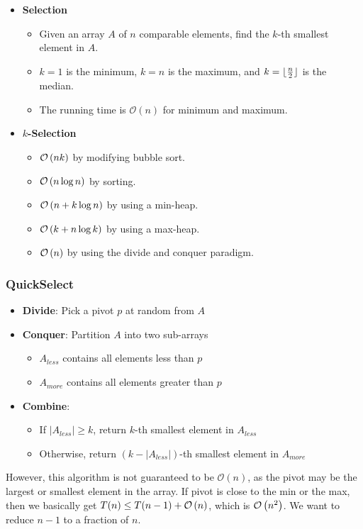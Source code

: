 \begin{itemize}
    \item \textbf{Selection}
    
    \begin{itemize}
        \item Given an array $A$ of $n$ comparable elements, find the $k$-th smallest element in $A$. 
        \item $k = 1$ is the minimum, $k = n$ is the maximum, and $k = \lfloor \frac{n}{2} \rfloor$ is the median. 
        \item The running time is $\mathcal{O}(n)$ for minimum and maximum. 
    \end{itemize}

    \item \textbf{$k$-Selection}

    \begin{itemize}
        \item $\mathcal{O}\left(nk\right)$ by modifying bubble sort.
        \item $\mathcal{O}\left(n \log n\right)$ by sorting. 
        \item $\mathcal{O}\left(n + k \log n\right)$ by using a min-heap.
        \item $\mathcal{O}\left(k + n \log k\right)$ by using a max-heap.
        \item $\mathcal{O}\left(n\right)$ by using the divide and conquer paradigm.
    \end{itemize}
\end{itemize}

\subsubsection{QuickSelect}

\begin{itemize}
    \item \textbf{Divide}: Pick a pivot $p$ at random from $A$

    \item \textbf{Conquer}: Partition $A$ into two sub-arrays 
    
    \begin{itemize}
        \item $A_{less}$ contains all elements less than $p$
        \item $A_{more}$ contains all elements greater than $p$
    \end{itemize}

    \item \textbf{Combine}: 
    \begin{itemize}
        \item If $|A_{less}| \ge k$, return $k$-th smallest element in $A_{less}$
        \item Otherwise, return $(k - |A_{less}|)$-th smallest element in $A_{more}$
    \end{itemize}
\end{itemize}

However, this algorithm is not guaranteed to be $\mathcal{O}(n)$, as the pivot may be the largest or smallest element in the array. If pivot is close to the min or the max, then we basically get $T(n) \le T(n - 1) + \mathcal{O}\left(n\right)$, which is $\mathcal{O}\left(n^2\right)$. We want to reduce $n - 1$ to a fraction of $n$. 

